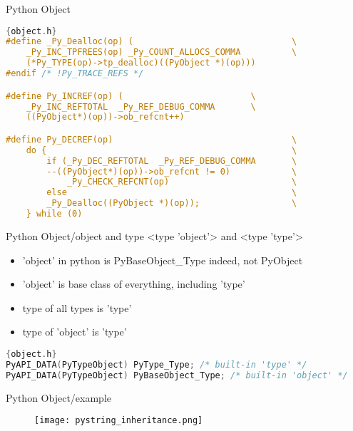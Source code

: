 \documentclass[xcolor=svgnames]{beamer}
\begin{document}
\begin{frame}[fragile]{Python Object}
    \begin{lstlisting}[language=C]{object.h}
#define _Py_Dealloc(op) (                               \
    _Py_INC_TPFREES(op) _Py_COUNT_ALLOCS_COMMA          \
    (*Py_TYPE(op)->tp_dealloc)((PyObject *)(op)))
#endif /* !Py_TRACE_REFS */

#define Py_INCREF(op) (                         \
    _Py_INC_REFTOTAL  _Py_REF_DEBUG_COMMA       \
    ((PyObject*)(op))->ob_refcnt++)

#define Py_DECREF(op)                                   \
    do {                                                \
        if (_Py_DEC_REFTOTAL  _Py_REF_DEBUG_COMMA       \
        --((PyObject*)(op))->ob_refcnt != 0)            \
            _Py_CHECK_REFCNT(op)                        \
        else                                            \
        _Py_Dealloc((PyObject *)(op));                  \
    } while (0)
\end{lstlisting} 
\end{frame}


\begin{frame}[fragile]{Python Object/object and type}
    <type 'object'> and <type 'type'>
    \begin{itemize}
        \item 'object' in python is PyBaseObject\_Type indeed, not PyObject
        \item 'object' is base class of everything, including 'type'
        \item type of all types is 'type'
        \item type of 'object' is 'type'
    \end{itemize}
    \begin{lstlisting}[language=C]{object.h}
PyAPI_DATA(PyTypeObject) PyType_Type; /* built-in 'type' */
PyAPI_DATA(PyTypeObject) PyBaseObject_Type; /* built-in 'object' */
    \end{lstlisting} 
\end{frame}

\begin{frame}[fragile]{Python Object/example}
    \begin{figure}
       \begin{center}
       \texttt{[image: pystring\_inheritance.png]}
       \end{center}
\end{figure}
\end{frame}
\end{document}
